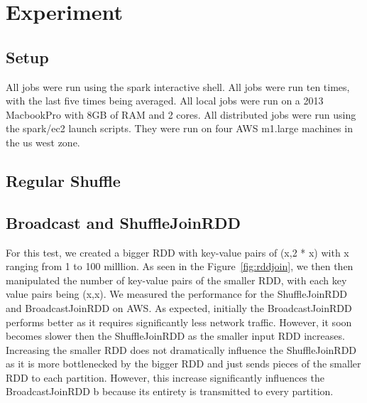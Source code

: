 \chapter{Experiment}

\section{Setup}

All jobs were run using the spark interactive shell.
All jobs were run ten times, with the last five times being averaged.
All local jobs were run on a 2013 MacbookPro with 8GB of RAM and 2 cores.
All distributed jobs were run using the spark/ec2 launch scripts. They were run on 
four AWS m1.large machines in the us west zone. 

\section{Regular Shuffle}


\section{Broadcast and ShuffleJoinRDD}

For this test, we created a bigger RDD with key-value pairs of (x,2 * x) with x ranging from 1 to 100 milllion.
As seen in the Figure~\ref{fig:rddjoin}, we then then manipulated the number of key-value pairs of the smaller RDD, 
with each key value pairs being (x,x). We measured the performance for the ShuffleJoinRDD and BroadcastJoinRDD on AWS. 
As expected, initially the BroadcastJoinRDD performs better as it requires significantly less network traffic.
However, it soon becomes slower then the ShuffleJoinRDD as the smaller input RDD increases.
Increasing the smaller RDD does not dramatically influence the ShuffleJoinRDD as it is more bottlenecked by the bigger RDD and just
sends pieces of the smaller RDD to each partition. However, this increase significantly influences the BroadcastJoinRDD b
because its entirety is transmitted to every partition.

